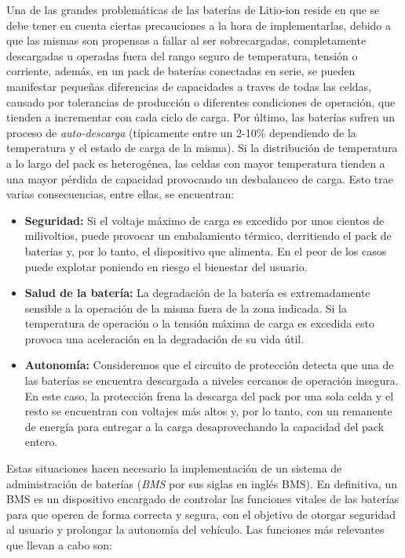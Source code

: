 \documentclass[10pt,a4paper]{article}
\begin{document}
\noindent Una de las grandes problem\'aticas de las bater\'ias de Litio-ion 
reside en que se debe tener en cuenta ciertas precauciones a la hora de
implementarlas, debido a que las mismas son propensas a fallar al ser 
sobrecargadas, completamente descargadas u operadas fuera del
rango seguro de temperatura, tensi\'on o corriente, adem\'as, en un pack de 
bater\'ias conectadas en serie, se pueden manifestar pequeñas diferencias de 
capacidades a traves de todas las celdas, causado por tolerancias de
producci\'on o diferentes condiciones de operaci\'on, que tienden
a incrementar con cada ciclo de carga. Por \'ultimo, las bater\'ias
sufren un proceso de \emph{auto-descarga} (t\'ipicamente entre un
2-10\% dependiendo de la temperatura y el estado de carga de la misma). 
Si la distribuci\'on de temperatura a lo largo del pack es
heterog\'enea, las celdas con mayor temperatura tienden a una mayor
p\'erdida de capacidad provocando un desbalanceo de carga.
Esto trae varias consecuencias, entre ellas, se encuentran:

\begin{itemize}
    \item \textbf{Seguridad:} Si el voltaje máximo de carga es excedido por 
        unos cientos de milivoltios, puede provocar un embalamiento térmico, 
        derritiendo el pack de baterias y, por lo tanto, el dispositivo que 
        alimenta. En el peor de los casos puede explotar poniendo en riesgo el 
        bienestar del usuario.
    \item \textbf{Salud de la batería:} La degradación de la batería es 
        extremadamente sensible a la operación de la misma fuera de la zona 
        indicada. Si la temperatura de operación o la tensión máxima de carga 
        es excedida esto provoca una aceleración en la degradación de su vida 
        útil.
    \item \textbf{Autonomía:} Consideremos que el circuito de protección 
        detecta que una de las baterías se encuentra descargada a niveles 
        cercanos de operación insegura. En este caso, la protección frena la 
        descarga del pack por una sola celda y el resto se encuentran con 
        voltajes más altos y, por lo tanto, con un remanente de energía para 
        entregar a la carga desaprovechando la capacidad del pack entero.
\end{itemize}

Estas situaciones hacen necesario la implementación de un sistema de
administración de baterías (\emph{\acrshort{BMS}} por sus siglas en inglés
\acrlong{BMS}). En definitiva, un \acrshort{BMS} es un dispositivo encargado de
controlar las funciones vitales de las baterías para que operen de forma
correcta y segura, con el objetivo de otorgar seguridad al usuario y prolongar
la autonomía del vehículo. Las funciones más relevantes que llevan a cabo son:
\end{document}
